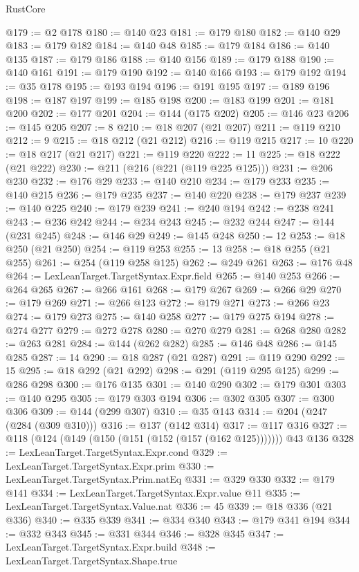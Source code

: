\begin{lexlean}{RustCore}
\begin{coremodule}
@179 := @2 @178
@180 := @140 @23
@181 := @179 @180
@182 := @140 @29
@183 := @179 @182
@184 := @140 @48
@185 := @179 @184
@186 := @140 @135
@187 := @179 @186
@188 := @140 @156
@189 := @179 @188
@190 := @140 @161
@191 := @179 @190
@192 := @140 @166
@193 := @179 @192
@194 := @35 @178
@195 := @193 @194
@196 := @191 @195
@197 := @189 @196
@198 := @187 @197
@199 := @185 @198
@200 := @183 @199
@201 := @181 @200
@202 := @177 @201
@204 := @144 (@175 @202)
@205 := @146 @23
@206 := @145 @205
@207 := 8
@210 := @18 @207 (@21 @207)
@211 := @119 @210
@212 := 9
@215 := @18 @212 (@21 @212)
@216 := @119 @215
@217 := 10
@220 := @18 @217 (@21 @217)
@221 := @119 @220
@222 := 11
@225 := @18 @222 (@21 @222)
@230 := @211 (@216 (@221 (@119 @225 @125)))
@231 := @206 @230
@232 := @176 @29
@233 := @140 @210
@234 := @179 @233
@235 := @140 @215
@236 := @179 @235
@237 := @140 @220
@238 := @179 @237
@239 := @140 @225
@240 := @179 @239
@241 := @240 @194
@242 := @238 @241
@243 := @236 @242
@244 := @234 @243
@245 := @232 @244
@247 := @144 (@231 @245)
@248 := @146 @29
@249 := @145 @248
@250 := 12
@253 := @18 @250 (@21 @250)
@254 := @119 @253
@255 := 13
@258 := @18 @255 (@21 @255)
@261 := @254 (@119 @258 @125)
@262 := @249 @261
@263 := @176 @48
@264 := LexLeanTarget.TargetSyntax.Expr.field
@265 := @140 @253
@266 := @264 @265
@267 := @266 @161
@268 := @179 @267
@269 := @266 @29
@270 := @179 @269
@271 := @266 @123
@272 := @179 @271
@273 := @266 @23
@274 := @179 @273
@275 := @140 @258
@277 := @179 @275 @194
@278 := @274 @277
@279 := @272 @278
@280 := @270 @279
@281 := @268 @280
@282 := @263 @281
@284 := @144 (@262 @282)
@285 := @146 @48
@286 := @145 @285
@287 := 14
@290 := @18 @287 (@21 @287)
@291 := @119 @290
@292 := 15
@295 := @18 @292 (@21 @292)
@298 := @291 (@119 @295 @125)
@299 := @286 @298
@300 := @176 @135
@301 := @140 @290
@302 := @179 @301
@303 := @140 @295
@305 := @179 @303 @194
@306 := @302 @305
@307 := @300 @306
@309 := @144 (@299 @307)
@310 := @35 @143
@314 := @204 (@247 (@284 (@309 @310)))
@316 := @137 (@142 @314)
@317 := @117 @316
@327 := @118 (@124 (@149 (@150 (@151 (@152 (@157 (@162 @125))))))) @43 @136
@328 := LexLeanTarget.TargetSyntax.Expr.cond
@329 := LexLeanTarget.TargetSyntax.Expr.prim
@330 := LexLeanTarget.TargetSyntax.Prim.natEq
@331 := @329 @330
@332 := @179 @141
@334 := LexLeanTarget.TargetSyntax.Expr.value @11
@335 := LexLeanTarget.TargetSyntax.Value.nat
@336 := 45
@339 := @18 @336 (@21 @336)
@340 := @335 @339
@341 := @334 @340
@343 := @179 @341 @194
@344 := @332 @343
@345 := @331 @344
@346 := @328 @345
@347 := LexLeanTarget.TargetSyntax.Expr.build
@348 := LexLeanTarget.TargetSyntax.Shape.true

\end{coremodule}
\end{lexlean}
